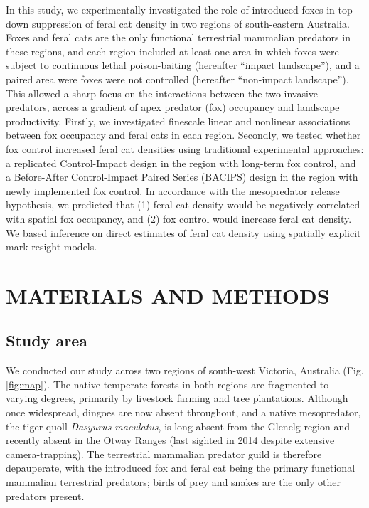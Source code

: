 \documentclass[]{elsarticle} %
\begin{document}
In this study, we experimentally investigated the role of introduced foxes in top-down suppression of feral cat density in two regions of south-eastern Australia. Foxes and feral cats are the only functional terrestrial mammalian predators in these regions, and each region included at least one area in which foxes were subject to continuous lethal poison-baiting (hereafter ``impact landscape''), and a paired area were foxes were not controlled (hereafter ``non-impact landscape''). This allowed a sharp focus on the interactions between the two invasive predators, across a gradient of apex predator (fox) occupancy and landscape productivity. Firstly, we investigated finescale linear and nonlinear associations between fox occupancy and feral cats in each region. Secondly, we tested whether fox control increased feral cat densities using traditional experimental approaches: a replicated Control-Impact design in the region with long-term fox control, and a Before-After Control-Impact Paired Series (BACIPS) design in the region with newly implemented fox control. In accordance with the mesopredator release hypothesis, we predicted that (1) feral cat density would be negatively correlated with spatial fox occupancy, and (2) fox control would increase feral cat density. We based inference on direct estimates of feral cat density using spatially explicit mark-resight models.

\newpage

\hypertarget{materials-and-methods}{%
\section{MATERIALS AND METHODS}\label{materials-and-methods}}

\hypertarget{study-area}{%
\subsection{Study area}\label{study-area}}

We conducted our study across two regions of south-west Victoria, Australia (Fig. \ref{fig:map}). The native temperate forests in both regions are fragmented to varying degrees, primarily by livestock farming and tree plantations. Although once widespread, dingoes are now absent throughout, and a native mesopredator, the tiger quoll \emph{Dasyurus maculatus}, is long absent from the Glenelg region and recently absent in the Otway Ranges (last sighted in 2014 despite extensive camera-trapping). The terrestrial mammalian predator guild is therefore depauperate, with the introduced fox and feral cat being the primary functional mammalian terrestrial predators; birds of prey and snakes are the only other predators present.
\end{document}
